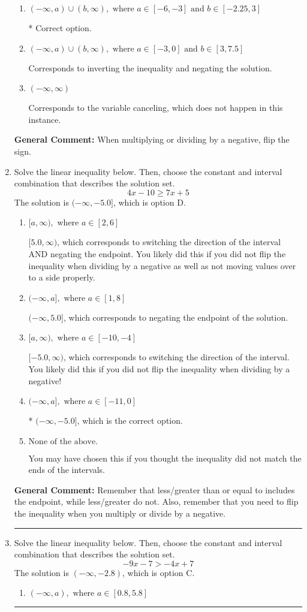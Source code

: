 \documentclass{extbook}[14pt]
\newcommand{\litem}[1]{\item #1

\rule{\textwidth}{0.4pt}}
\begin{document}
\begin{enumerate}
{\begin{enumerate}[label=\Alph*.]
Corresponds to including the endpoints (when they should be excluded).
\item \( (-\infty, a) \cup (b, \infty), \text{ where } a \in [-6, -3] \text{ and } b \in [-2.25, 3] \)

 * Correct option.
\item \( (-\infty, a) \cup (b, \infty), \text{ where } a \in [-3, 0] \text{ and } b \in [3, 7.5] \)

Corresponds to inverting the inequality and negating the solution.
\item \( (-\infty, \infty) \)

Corresponds to the variable canceling, which does not happen in this instance.
\end{enumerate}

\textbf{General Comment:} When multiplying or dividing by a negative, flip the sign.
}
\litem{
Solve the linear inequality below. Then, choose the constant and interval combination that describes the solution set.
\[ 4x -10 \geq 7x + 5 \]The solution is \( (-\infty, -5.0] \), which is option D.\begin{enumerate}[label=\Alph*.]
\item \( [a, \infty), \text{ where } a \in [2, 6] \)

 $[5.0, \infty)$, which corresponds to switching the direction of the interval AND negating the endpoint. You likely did this if you did not flip the inequality when dividing by a negative as well as not moving values over to a side properly.
\item \( (-\infty, a], \text{ where } a \in [1, 8] \)

 $(-\infty, 5.0]$, which corresponds to negating the endpoint of the solution.
\item \( [a, \infty), \text{ where } a \in [-10, -4] \)

 $[-5.0, \infty)$, which corresponds to switching the direction of the interval. You likely did this if you did not flip the inequality when dividing by a negative!
\item \( (-\infty, a], \text{ where } a \in [-11, 0] \)

* $(-\infty, -5.0]$, which is the correct option.
\item \( \text{None of the above}. \)

You may have chosen this if you thought the inequality did not match the ends of the intervals.
\end{enumerate}

\textbf{General Comment:} Remember that less/greater than or equal to includes the endpoint, while less/greater do not. Also, remember that you need to flip the inequality when you multiply or divide by a negative.
}
\litem{
Solve the linear inequality below. Then, choose the constant and interval combination that describes the solution set.
\[ -9x -7 > -4x + 7 \]The solution is \( (-\infty, -2.8) \), which is option C.\begin{enumerate}[label=\Alph*.]
\item \( (-\infty, a), \text{ where } a \in [0.8, 5.8] \)


\end{enumerate}}
\end{enumerate}
\end{document}
